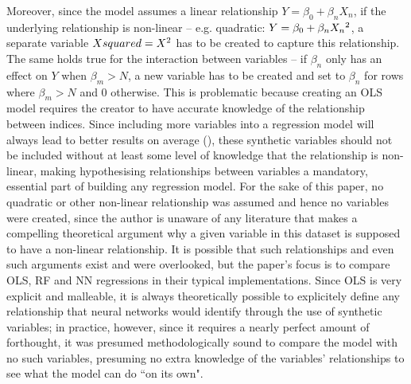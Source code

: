 \documentclass[12pt]{report}
\begin{document}
Moreover, since the model assumes a linear relationship \(Y=\beta_0+\beta_n X_n\), if the underlying relationship is non-linear -- e.g. quadratic: \(Y=\beta_0 + \beta_n X_n\textsuperscript{2}\), a separate variable \(Xsquared=X\textsuperscript{2}\) has to be created to capture this relationship. The same holds true for the interaction between variables -- if $\beta_n$ only has an effect on $Y$ when $\beta_m>N$, a new variable has to be created and set to $\beta_n$ for rows where $\beta_m>N$ and 0 otherwise. This is problematic because creating an OLS model requires the creator to have accurate knowledge of the relationship between indices. Since including more variables into a regression model will always lead to better results on average (\cite{Aoki2023}), these synthetic variables should not be included without at least some level of knowledge that the relationship is non-linear, making hypothesising relationships between variables a mandatory, essential part of building any regression model. For the sake of this paper, no quadratic or other non-linear relationship was assumed and hence no variables were created, since the author is unaware of any literature that makes a compelling theoretical argument why a given variable in this dataset is supposed to have a non-linear relationship. It is possible that such relationships and even such arguments exist and were overlooked, but the paper's focus is to compare OLS, RF and NN regressions in their typical implementations. Since OLS is very explicit and malleable, it is always theoretically possible to explicitely define any relationship that neural networks would identify through the use of synthetic variables; in practice, however, since it requires a nearly perfect amount of forthought, it was presumed methodologically sound to compare the model with no such variables, presuming no extra knowledge of the variables' relationships to see what the model can do ``on its own".
\end{document}

